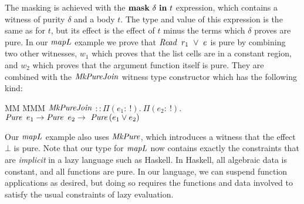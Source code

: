 The masking is achieved with the $\kmask \ \delta \ \kin \ t$ expression, which contains a witness of purity $\delta$ and a body $t$. The type and value of this expression is the same as for $t$, but its effect is the effect of $t$ minus the terms which $\delta$ proves are pure. In our $\operatorname{\mathit{mapL}}$ example we prove that $\iRead \ r_1 \ \lor \ e$ is pure by combining two other witnesses, $w_1$ which proves that the list cells are in a constant region, and $w_2$ which proves that the argument function itself is pure. They are combined with the $\operatorname{\mathit{MkPureJoin}}$ witness type constructor which has the following kind:

\begin{tabbing}
MM \= MMM \kill
	\> $\operatorname{\mathit{MkPureJoin}}$ $:: \Pi (e_1 : \ !). \ \Pi (e_2 : \ !). $ 
		$\iPure \ e_1 \to \iPure \ e_2 \to \ \iPure{(e_1 \lor e_2)}$ 
\end{tabbing}

Our $\operatorname{\mathit{mapL}}$ example also uses $\operatorname{\mathit{MkPure}}$, which introduces a witness that the effect $\bot$ is pure. Note that our type for $\operatorname{\mathit{mapL}}$ now contains exactly the constraints that are \emph{implicit} in a lazy language such as Haskell. In Haskell, all algebraic data is constant, and all functions are pure. In our language, we can suspend function applications as desired, but doing so requires the functions and data involved to satisfy the usual constraints of lazy evaluation.

